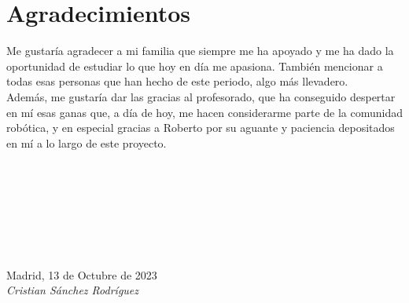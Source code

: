 \cleardoublepage

\chapter*{Agradecimientos}

Me gustaría agradecer a mi familia que siempre me ha apoyado y me ha dado la oportunidad de estudiar lo que hoy en día me apasiona. También mencionar a todas esas personas que han hecho de este periodo, algo más llevadero.\\

Además, me gustaría dar las gracias al profesorado, que ha conseguido despertar en mí esas ganas que, a día de hoy, me hacen considerarme parte de la comunidad robótica, y en especial gracias a Roberto por su aguante y paciencia depositados en mí a lo largo de este proyecto.


\

\

\

\

\begin{flushright}
		\par
		\vspace{1.0 cm}
		Madrid, 13 de Octubre de 2023\\ %
		\emph{Cristian Sánchez Rodríguez}
\end{flushright}

\thispagestyle{empty}

